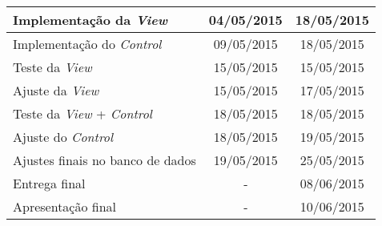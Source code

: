 \documentclass[a4paper,12pt]{article}
\begin{document}
{\begin{longtable}{|l|c|c|}
\hline
Implementação da \textit{View}            & 04/05/2015                           & 18/05/2015                        \\ \hline

\hline
Implementação do \textit{Control}         & 09/05/2015                           & 18/05/2015                        \\ \hline



Teste da \textit{View}                    & 15/05/2015                           & 15/05/2015                        \\ \hline
Ajuste da \textit{View}                   & 15/05/2015                           & 17/05/2015                        \\ \hline
Teste da \textit{View} + \textit{Control} & 18/05/2015                           & 18/05/2015                        \\ \hline
Ajuste do \textit{Control}                & 18/05/2015                           & 19/05/2015                        \\ \hline
Ajustes finais no banco de dados          & 19/05/2015                           & 25/05/2015                        \\ \hline
Entrega final                             & \multicolumn{1}{c|}{-}               & 08/06/2015                        \\ \hline
Apresentação final                        & \multicolumn{1}{c|}{-}               & 10/06/2015                        \\ \hline
\end{longtable}
}
\end{document}
